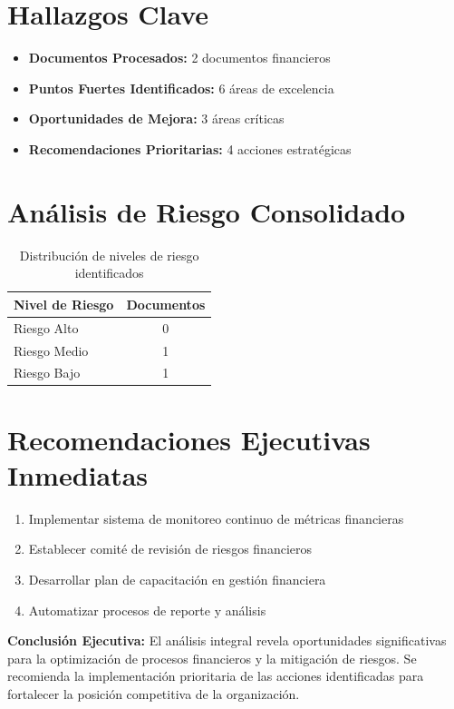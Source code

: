 \documentclass[11pt]{report}
\begin{document}
\section*{Hallazgos Clave}
\begin{itemize}[left=0pt]
    \item \textbf{Documentos Procesados:} 2 documentos financieros
    \item \textbf{Puntos Fuertes Identificados:} 6 áreas de excelencia
    \item \textbf{Oportunidades de Mejora:} 3 áreas críticas
    \item \textbf{Recomendaciones Prioritarias:} 4 acciones estratégicas
\end{itemize}

\section*{Análisis de Riesgo Consolidado}
\begin{table}[H]
    \centering
    \begin{tabular}{lc}
        \toprule
        \textbf{Nivel de Riesgo} & \textbf{Documentos} \\
        \midrule
        Riesgo Alto & 0 \\
        Riesgo Medio & 1 \\
        Riesgo Bajo & 1 \\
        \bottomrule
    \end{tabular}
    \caption{Distribución de niveles de riesgo identificados}
\end{table}

\section*{Recomendaciones Ejecutivas Inmediatas}
\begin{enumerate}[label=\textbf{Recomendación \arabic*:}, left=0pt]
    \item Implementar sistema de monitoreo continuo de métricas financieras
    \item Establecer comité de revisión de riesgos financieros
    \item Desarrollar plan de capacitación en gestión financiera
    \item Automatizar procesos de reporte y análisis
\end{enumerate}

\vspace{1cm}
\noindent
\textbf{Conclusión Ejecutiva:} El análisis integral revela oportunidades significativas 
para la optimización de procesos financieros y la mitigación de riesgos. Se recomienda 
la implementación prioritaria de las acciones identificadas para fortalecer la posición 
competitiva de la organización.
\end{document}
